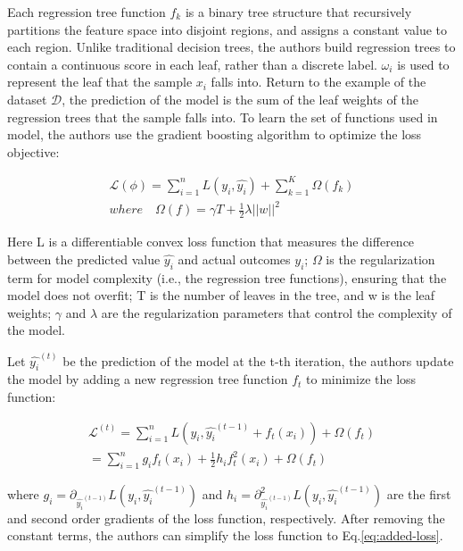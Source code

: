 \documentclass[../main.tex]{subfiles}
\begin{document}
Each regression tree function $f_k$ is a binary tree structure that recursively partitions the feature space into disjoint regions, and assigns a constant value to each region.
Unlike traditional decision trees, the authors build regression trees to contain a continuous score in each leaf, rather than a discrete label.
$\omega_i$ is used to represent the leaf that the sample $x_i$ falls into.
Return to the example of the dataset $\mathcal{D}$, the prediction of the model is the sum of the leaf weights of the regression trees that the sample falls into.
To learn the set of functions used in model, the authors use the gradient boosting algorithm to optimize the loss objective:

\begin{equation}
    \begin{aligned}
        \mathcal{L}(\phi) =  \sum_{i=1}^n L(y_i, \hat{y_i}) + \sum_{k=1}^K \Omega(f_k) \\
        where \quad \Omega(f) = \gamma T + \frac{1}{2} \lambda ||w||^2
    \end{aligned}
\end{equation}

Here L is a differentiable convex loss function that measures the difference between the predicted value $\hat{y_i}$ and actual outcomes $y_i$;
$\Omega$ is the regularization term for model complexity (i.e., the regression tree functions), ensuring that the model does not overfit;
T is the number of leaves in the tree, and w is the leaf weights;
$\gamma$ and $\lambda$ are the regularization parameters that control the complexity of the model.

Let $\hat{y_i}^{(t)}$ be the prediction of the model at the t-th iteration, the authors update the model by adding a new regression tree function $f_t$ to minimize the loss function:

\begin{equation}
    \label{eq:added-loss}
    \begin{aligned}
        \mathcal{L}^{(t)} = \sum_{i=1}^n L(y_i, \hat{y_i}^{(t-1)} + f_t(x_i)) + \Omega(f_t) \\
        = \sum_{i=1}^n g_i f_t(x_i) + \frac{1}{2} h_i f_t^2(x_i) + \Omega(f_t)
    \end{aligned}
\end{equation}

where $g_i = \partial_{\hat{y_i}^{(t-1)}} L(y_i, \hat{y_i}^{(t-1)})$ and $h_i = \partial^2_{\hat{y_i}^{(t-1)}} L(y_i, \hat{y_i}^{(t-1)})$ are the first and second order gradients of the loss function, respectively.
After removing the constant terms, the authors can simplify the loss function to Eq.\ref{eq:added-loss}.
\end{document}
